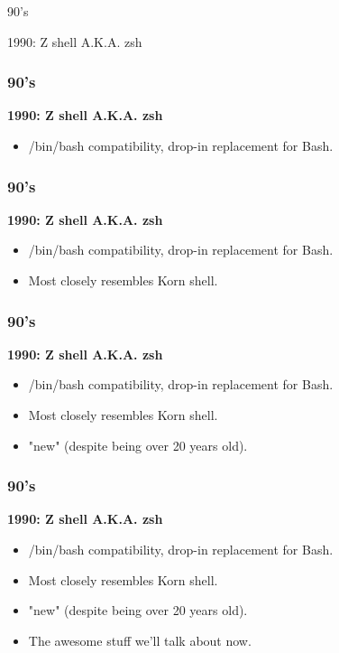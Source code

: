 \documentclass[aspectratio=169]{beamer}
\begin{document}

\begin{frame}
	\Huge{90's}
\end{frame}

\begin{frame}
    \Huge{\centerline{1990: Z shell A.K.A. zsh}}
\end{frame}

\begin{frame}
	\frametitle{ 90's}
	\textbf{1990: Z shell A.K.A. zsh}
	\begin{itemize}
		\item /bin/bash compatibility, drop-in replacement for Bash.
	\end{itemize}
\end{frame}

\begin{frame}
	\frametitle{ 90's}
	\textbf{1990: Z shell A.K.A. zsh}
	\begin{itemize}
		\item /bin/bash compatibility, drop-in replacement for Bash.
		\item Most closely resembles Korn shell.
	\end{itemize}
\end{frame}

\begin{frame}
	\frametitle{ 90's}
	\textbf{1990: Z shell A.K.A. zsh}
	\begin{itemize}
		\item /bin/bash compatibility, drop-in replacement for Bash.
		\item Most closely resembles Korn shell.
		\item "new" (despite being over 20 years old).
	\end{itemize}
\end{frame}

\begin{frame}
	\frametitle{ 90's}
	\textbf{1990: Z shell A.K.A. zsh}
	\begin{itemize}
		\item /bin/bash compatibility, drop-in replacement for Bash.
		\item Most closely resembles Korn shell.
		\item "new" (despite being over 20 years old).
		\item The awesome stuff we'll talk about now.
	\end{itemize}
\end{frame}
\end{document}
